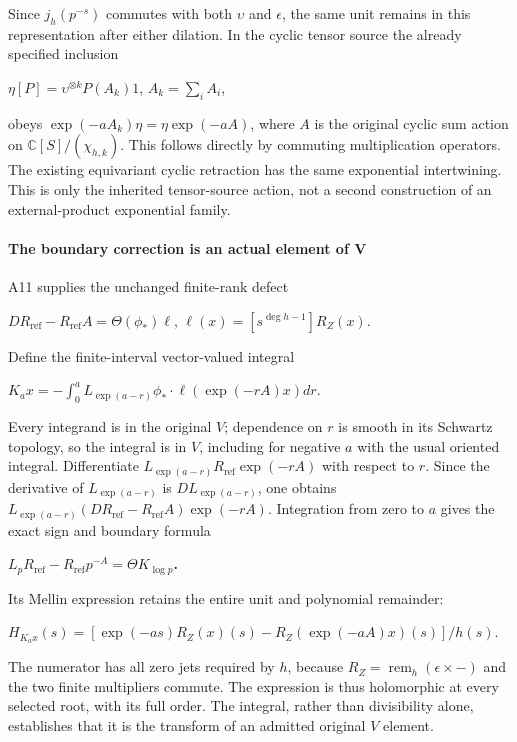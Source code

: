\documentclass{article}
\begin{document}
Since \(j_h(p^{-s})\) commutes with both \(\upsilon\) and \(\epsilon\), the same unit remains in this representation after either dilation. In the cyclic tensor source the already specified inclusion

\(\eta[P]=\upsilon^{\otimes k} P(A_k)1\), \(A_k=\sum_i A_i\),

obeys \(\exp(-aA_k)\eta=\eta \exp(-aA)\), where \(A\) is the original cyclic sum action on \(\mathbb C[S]/(\chi_{h,k})\). This follows directly by commuting multiplication operators. The existing equivariant cyclic retraction has the same exponential intertwining. This is only the inherited tensor-source action, not a second construction of an external-product exponential family.

\paragraph{The boundary correction is an actual element of V}\label{endpoint-f1_scaling--the-boundary-correction-is-an-actual-element-of-v}

A11 supplies the unchanged finite-rank defect

\(D R_{\mathrm{ref}}-R_{\mathrm{ref}} A=\Theta(\phi_*) \ell\), \(\ell(x)=[s^{\deg h-1}]R_Z(x)\).

Define the finite-interval vector-valued integral

\(K_a x=-\int_0^a L_{\exp(a-r)}\phi_* \cdot  \ell(\exp(-rA)x) dr\).

Every integrand is in the original \(V\); dependence on \(r\) is smooth in its Schwartz topology, so the integral is in \(V\), including for negative \(a\) with the usual oriented integral. Differentiate \(L_{\exp(a-r)} R_{\mathrm{ref}} \exp(-rA)\) with respect to \(r\). Since the derivative of \(L_{\exp(a-r)}\) is \(D L_{\exp(a-r)}\), one obtains \(L_{\exp(a-r)}(D R_{\mathrm{ref}}-R_{\mathrm{ref}} A)\exp(-rA)\). Integration from zero to \(a\) gives the exact sign and boundary formula

\textbf{\(L_p R_{\mathrm{ref}}-R_{\mathrm{ref}} p^{-A}=\Theta K_{\log p}\).}

Its Mellin expression retains the entire unit and polynomial remainder:

\(H_{K_a x}(s)=[\exp(-as)R_Z(x)(s)-R_Z(\exp(-aA)x)(s)]/h(s)\).

The numerator has all zero jets required by \(h\), because \(R_Z=\operatorname{rem}_h(\epsilon\times\mathord{-})\) and the two finite multipliers commute. The expression is thus holomorphic at every selected root, with its full order. The integral, rather than divisibility alone, establishes that it is the transform of an admitted original \(V\) element.
\end{document}
